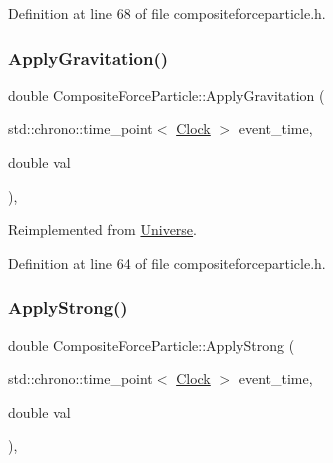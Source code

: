 Definition at line 68 of file compositeforceparticle.\+h.

\mbox{\label{class_composite_force_particle_ae26a03c2970a3825e8583a811339b28d}} 
\subsubsection{\texorpdfstring{Apply\+Gravitation()}{ApplyGravitation()}}
{\footnotesize\ttfamily double Composite\+Force\+Particle\+::\+Apply\+Gravitation (\begin{DoxyParamCaption}\item[{std\+::chrono\+::time\+\_\+point$<$ \mbox{\hyperlink{universe_8h_a0ef8d951d1ca5ab3cfaf7ab4c7a6fd80}{Clock}} $>$}]{event\+\_\+time,  }\item[{double}]{val }\end{DoxyParamCaption})\hspace{0.3cm}{\ttfamily [inline]}, {\ttfamily [virtual]}}



Reimplemented from \mbox{\hyperlink{class_universe_a76c0b5e63c2a7d1988c44db341c3d64c}{Universe}}.



Definition at line 64 of file compositeforceparticle.\+h.

\mbox{\label{class_composite_force_particle_ac1464a04fbbca2d8927dfdbef0429878}} 
\subsubsection{\texorpdfstring{Apply\+Strong()}{ApplyStrong()}}
{\footnotesize\ttfamily double Composite\+Force\+Particle\+::\+Apply\+Strong (\begin{DoxyParamCaption}\item[{std\+::chrono\+::time\+\_\+point$<$ \mbox{\hyperlink{universe_8h_a0ef8d951d1ca5ab3cfaf7ab4c7a6fd80}{Clock}} $>$}]{event\+\_\+time,  }\item[{double}]{val }\end{DoxyParamCaption})\hspace{0.3cm}{\ttfamily [inline]}, {\ttfamily [virtual]}}



